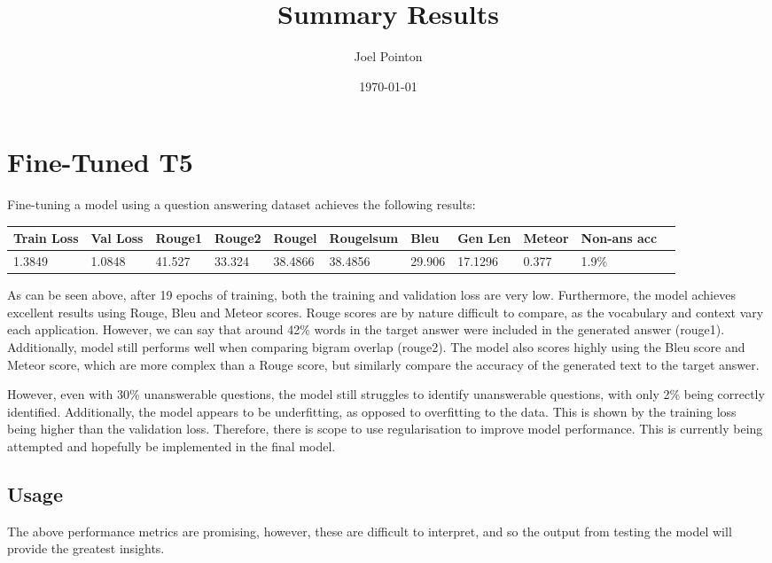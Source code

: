 \documentclass{article}
\title{\vspace{-1.3cm}Summary Results}
\author{Joel Pointon}
\date{\today}
\begin{document}
\maketitle
\section{Fine-Tuned T5}
Fine-tuning a model using a question answering dataset achieves the following results:
\begin{table}[!ht]
    \centering
    \begin{tabular}{|l|l|l|l|l|l|l|l|l|l|l|}
    \hline
        Train Loss & Val Loss & Rouge1 & Rouge2 & Rougel & Rougelsum & Bleu & Gen Len & Meteor & Non-ans acc \\ \hline
        1.3849 & 1.0848 & 41.527 & 33.324 & 38.4866 & 38.4856 & 29.906 & 17.1296 & 0.377 & 1.9\% \\ \hline
    \end{tabular}
\end{table}

As can be seen above, after 19 epochs of training, both the training and validation loss are very low. Furthermore, the model achieves excellent results using Rouge, Bleu and Meteor scores. Rouge scores are by nature difficult to compare, as the vocabulary and context vary each application. However, we can say that around 42\% words in the target answer were included in the generated answer (rouge1). Additionally, model still performs well when comparing bigram overlap (rouge2). The model also scores highly using the Bleu score and Meteor score, which are more complex than a Rouge score, but similarly compare the accuracy of the generated text to the target answer.

However, even with 30\% unanswerable questions, the model still struggles to identify unanswerable questions, with only 2\% being correctly identified. Additionally, the model appears to be underfitting, as opposed to overfitting to the data. This is shown by the training loss being higher than the validation loss. Therefore, there is scope to use regularisation to improve model performance. This is currently being attempted and hopefully be implemented in the final model.

\subsection{Usage}
The above performance metrics are promising, however, these are difficult to interpret, and so the output from testing the model will provide the greatest insights.
\end{document}
